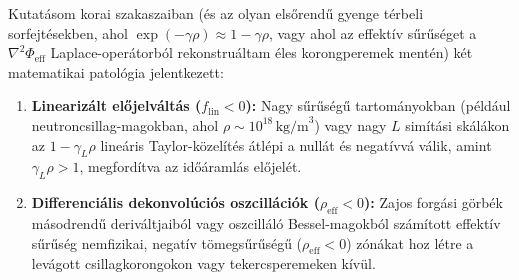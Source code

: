 \documentclass[10pt,a4paper]{article}
\begin{document}
\par
Kutat\'asom korai szakaszaiban (\'es az olyan els\H{o}rend\H{u} gyenge t\'erbeli sorfejt\'esekben, ahol $\exp(-\gamma\rho) \approx 1 - \gamma\rho$, vagy ahol az effekt\'iv s\H{u}r\H{u}s\'eget a $\nabla^2\Phi_{\text{eff}}$ Laplace-oper\'atorb\'ol rekonstru\'altam \'eles korongperemek ment\'en) k\'et matematikai patol\'ogia jelentkezett:
\begin{enumerate}\setlength{\itemsep}{1pt}\setlength{\parskip}{0pt}\setlength{\topsep}{1pt}
  \item \textbf{Lineariz\'alt el\H{o}jelv\'alt\'as ($f_{\text{lin}} < 0$):} Nagy s\H{u}r\H{u}s\'eg\H{u} tartom\'anyokban (p\'eld\'aul neutroncsillag-magokban, ahol $\rho \sim 10^{18}\,\text{kg/m}^3$) vagy nagy $L$ sim\'it\'asi sk\'al\'akon az $1 - \gamma_L\rho$ line\'aris Taylor-k\"ozel\'it\'es \'atlépi a null\'at \'es negat\'ivv\'a v\'alik, amint $\gamma_L\rho > 1$, megford\'itva az id\H{o}\'araml\'as el\H{o}jel\'et.
  \item \textbf{Differenci\'alis dekonvol\'uci\'os oszcill\'aci\'ok ($\rho_{\text{eff}} < 0$):} Zajos forg\'asi g\"orb\'ek m\'asodrend\H{u} deriv\'altjaib\'ol vagy oszcill\'al\'o Bessel-magokb\'ol sz\'am\'itott effekt\'iv s\H{u}r\H{u}s\'eg nemfizikai, negat\'iv t\"omegs\H{u}r\H{u}s\'eg\H{u} ($\rho_{\text{eff}} < 0$) z\'on\'akat hoz l\'etre a lev\'agott csillagkorongokon vagy tekercsperemeken k\'iv\"ul.
\end{enumerate}
\end{document}
